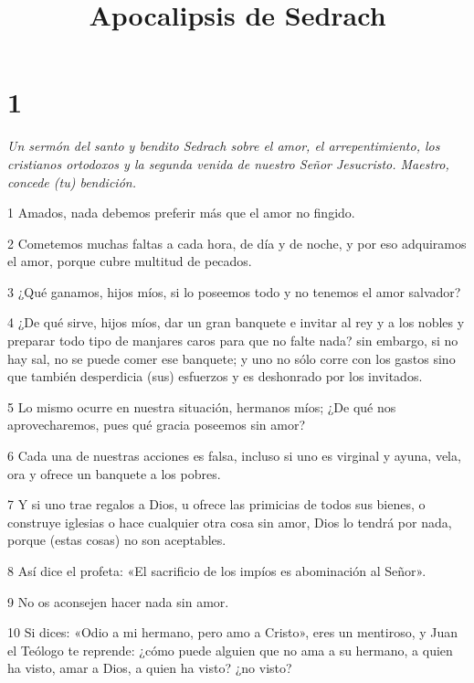 

\title{Apocalipsis de Sedrach}

\chapter{1}

\par \textit{Un sermón del santo y bendito Sedrach sobre el amor, el arrepentimiento, los cristianos ortodoxos y la segunda venida de nuestro Señor Jesucristo. Maestro, concede (tu) bendición.}

\par 1 Amados, nada debemos preferir más que el amor no fingido.

\par 2 Cometemos muchas faltas a cada hora, de día y de noche, y por eso adquiramos el amor, porque cubre multitud de pecados.

\par 3 ¿Qué ganamos, hijos míos, si lo poseemos todo y no tenemos el amor salvador?

\par 4 ¿De qué sirve, hijos míos, dar un gran banquete e invitar al rey y a los nobles y preparar todo tipo de manjares caros para que no falte nada? sin embargo, si no hay sal, no se puede comer ese banquete; y uno no sólo corre con los gastos sino que también desperdicia (sus) esfuerzos y es deshonrado por los invitados.

\par 5 Lo mismo ocurre en nuestra situación, hermanos míos; ¿De qué nos aprovecharemos, pues qué gracia poseemos sin amor?

\par 6 Cada una de nuestras acciones es falsa, incluso si uno es virginal y ayuna, vela, ora y ofrece un banquete a los pobres.

\par 7 Y si uno trae regalos a Dios, u ofrece las primicias de todos sus bienes, o construye iglesias o hace cualquier otra cosa sin amor, Dios lo tendrá por nada, porque (estas cosas) no son aceptables.

\par 8 Así dice el profeta: «El sacrificio de los impíos es abominación al Señor».

\par 9 No os aconsejen hacer nada sin amor.

\par 10 Si dices: «Odio a mi hermano, pero amo a Cristo», eres un mentiroso, y Juan el Teólogo te reprende: ¿cómo puede alguien que no ama a su hermano, a quien ha visto, amar a Dios, a quien ha visto? ¿no visto?

